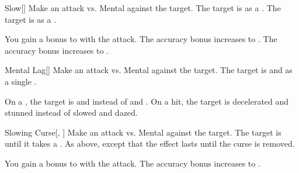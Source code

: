 \lowercase{\hypertarget{spell:Slow}{}}\label{spell:Slow}
\begin{freeability}[Rank 1]{\hypertarget{spell:Slow}{Slow}}[]
Make an attack vs. Mental against the target.
\hit The target is  as a .
\crit The target is  as a .

\rankline
{} You gain a  bonus to  with the attack.
 The accuracy bonus increases to .
 The accuracy bonus increases to .
\end{freeability}
\vspace{0.25em}



\lowercase{\hypertarget{spell:Mental Lag}{}}\label{spell:Mental Lag}
\begin{freeability}[Rank 3]{\hypertarget{spell:Mental Lag}{Mental Lag}}[]
Make an attack vs. Mental against the target.
\hit The target is  and  as a single .

\rankline
{} On a , the target is  and  instead of  and .
 On a hit, the target is decelerated and stunned instead of slowed and dazed.
\end{freeability}
\vspace{0.25em}



\lowercase{\hypertarget{spell:Slowing Curse}{}}\label{spell:Slowing Curse}
\begin{freeability}[Rank 3]{\hypertarget{spell:Slowing Curse}{Slowing Curse}}[, ]
Make an attack vs. Mental against the target.
\hit The target is  until it takes a .
\crit As above, except that the effect lasts until the curse is removed.

\rankline
{} You gain a  bonus to  with the attack.
 The accuracy bonus increases to .
\end{freeability}
\vspace{0.25em}



